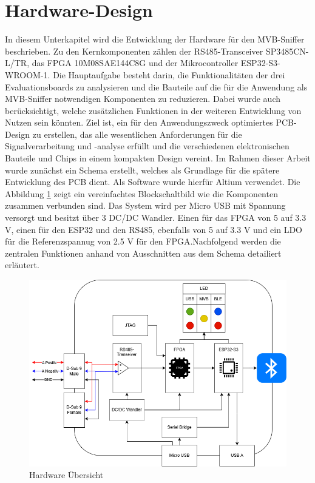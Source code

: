 
\section{Hardware-Design}

In diesem Unterkapitel wird die Entwicklung der Hardware für den MVB-Sniffer beschrieben. Zu den Kernkomponenten zählen der RS485-Transceiver SP3485CN-L/TR, das FPGA 10M08SAE144C8G und der Mikrocontroller ESP32-S3-WROOM-1. Die Hauptaufgabe besteht darin, die Funktionalitäten der drei Evaluationsboards zu analysieren und die Bauteile auf die für die Anwendung als MVB-Sniffer notwendigen Komponenten zu reduzieren. Dabei wurde auch berücksichtigt, welche zusätzlichen Funktionen in der weiteren Entwicklung von Nutzen sein könnten. Ziel ist, ein für den Anwendungszweck optimiertes PCB-Design zu erstellen, das alle wesentlichen Anforderungen für die Signalverarbeitung und -analyse erfüllt und die verschiedenen elektronischen Bauteile und Chips in einem kompakten Design vereint. Im Rahmen dieser Arbeit wurde zunächst ein Schema erstellt, welches als Grundlage für die spätere Entwicklung des PCB dient. Als Software wurde hierfür Altium verwendet. Die Abbildung \ref{fig:Hardware Übersicht} zeigt ein vereinfachtes Blockschaltbild wie die Komponenten zusammen verbunden sind. Das System wird per Micro USB mit Spannung versorgt und besitzt über 3 DC/DC Wandler. Einen für das FPGA von 5 auf 3.3 V, einen für den ESP32 und den RS485, ebenfalls von 5 auf 3.3 V und ein LDO für die Referenzspannug von 2.5 V für den FPGA.Nachfolgend werden die zentralen Funktionen anhand von Ausschnitten aus dem Schema detailiert erläutert.

\begin{figure}[H]
    \centering
    \includegraphics[width=0.8\linewidth]{Figures/Chap3/Schematics/Aufbau_Hardware_Sniffer.drawio.png}
    \caption{Hardware Übersicht}
    \label{fig:Hardware Übersicht}
\end{figure}


